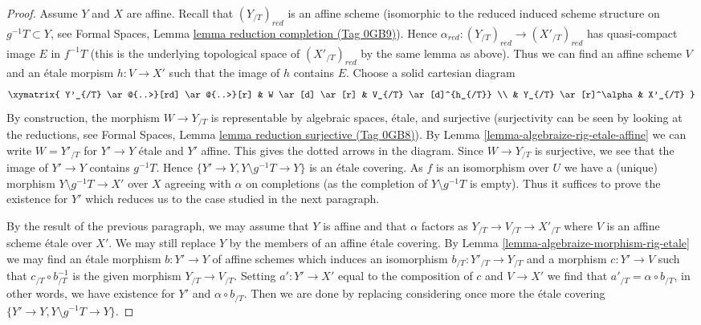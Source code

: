 \documentclass{amsart}
\theoremstyle{plain}
\theoremstyle{definition}
\theoremstyle{remark}
\numberwithin{equation}{subsection}
\begin{document}
\begin{proof}
\medskip\noindent
Assume $Y$ and $X$ are affine. Recall that $(Y_{/T})_{red}$
is an affine scheme (isomorphic to the reduced induced scheme structure
on $g^{-1}T \subset Y$, see Formal Spaces, Lemma
\href{https://stacks.math.columbia.edu/tag/0GB9}{lemma reduction completion (Tag 0GB9)}).
Hence $\alpha_{red} : (Y_{/T})_{red} \to (X'_{/T})_{red}$
has quasi-compact image $E$ in $f^{-1}T$ (this is the underlying
topological space of $(X'_{/T})_{red}$ by the same lemma as above).
Thus we can find an affine scheme $V$ and an \'etale morpism
$h : V \to X'$ such that the image of $h$ contains $E$.
Choose a solid cartesian diagram
$$
\xymatrix{
Y'_{/T} \ar@{..>}[rd] \ar@{..>}[r] &
W \ar[d] \ar[r] & V_{/T} \ar[d]^{h_{/T}} \\
& Y_{/T} \ar[r]^\alpha & X'_{/T}
}
$$
By construction, the morphism $W \to Y_{/T}$ is representable by
algebraic spaces, \'etale, and surjective
(surjectivity can be seen by looking at the reductions, see
Formal Spaces, Lemma
\href{https://stacks.math.columbia.edu/tag/0GB8}{lemma reduction surjective (Tag 0GB8)}).
By Lemma \ref{lemma-algebraize-rig-etale-affine}
we can write $W = Y'_{/T}$ for $Y' \to Y$ \'etale and $Y'$ affine.
This gives the dotted arrows in the diagram.
Since $W \to Y_{/T}$ is surjective, we see that
the image of $Y' \to Y$ contains $g^{-1}T$.
Hence $\{Y' \to Y, Y \setminus g^{-1}T \to Y\}$
is an \'etale covering. As $f$ is an isomorphism over $U$ we have a
(unique) morphism $Y \setminus g^{-1}T \to X'$ over $X$
agreeing with $\alpha$ on completions
(as the completion of $Y \setminus g^{-1}T$ is empty).
Thus it suffices to prove the existence for $Y'$
which reduces us to the case studied in the next paragraph.

\medskip\noindent
By the result of the previous paragraph, we may assume that $Y$ is affine
and that $\alpha$ factors as $Y_{/T} \to V_{/T} \to X'_{/T}$
where $V$ is an affine scheme \'etale over $X'$. We may still replace $Y$ by
the members of an affine \'etale covering.
By Lemma \ref{lemma-algebraize-morphism-rig-etale}
we may find an \'etale morphism $b : Y' \to Y$ of affine schemes
which induces an isomorphism $b_{/T} : Y'_{/T} \to Y_{/T}$
and a morphism $c : Y' \to V$ such that $c_{/T} \circ b_{/T}^{-1}$
is the given morphism $Y_{/T} \to V_{/T}$. Setting
$a' : Y' \to X'$ equal to the composition of $c$ and $V \to X'$
we find that $a'_{/T} = \alpha \circ b_{/T}$, in other words, we have
existence for $Y'$ and $\alpha \circ b_{/T}$.
Then we are done by replacing considering once more
the \'etale covering $\{Y' \to Y, Y \setminus g^{-1}T \to Y\}$.
\end{proof}
\end{document}
